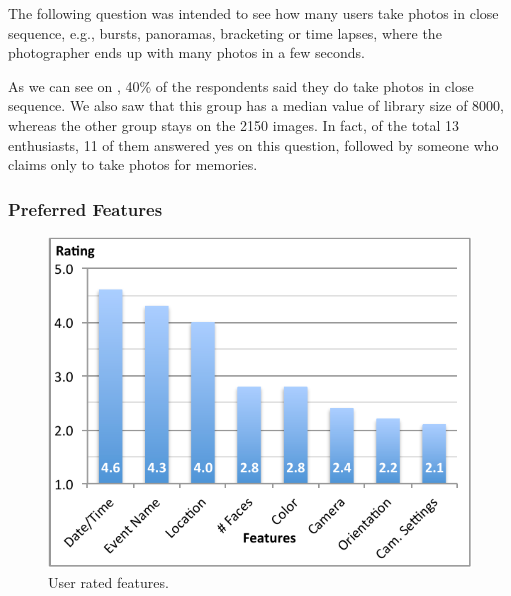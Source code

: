 
The following question was intended to see how many users take photos in close sequence, e.g., bursts, panoramas, bracketing or time lapses, where the photographer ends up with many photos in a few seconds.

As we can see on , 40\% of the respondents said they do take photos in close sequence. We also saw that this group has a median value of library size of 8000, whereas the other group stays on the 2150 images. In fact, of the total 13 enthusiasts, 11 of them answered yes on this question, followed by someone who claims only to take photos for memories.



\subsubsection{Preferred Features} %
\label{ssub:preferred_features}

\begin{figure}
	\vspace{-50pt}
	\begin{center}
		\includegraphics[width=\linewidth]{Figures/survey/features}
	\end{center}
	\vspace{-20pt}
	\caption{User rated features.}
	\vspace{-5pt}
	\label{fig:us:features}
\end{figure}

